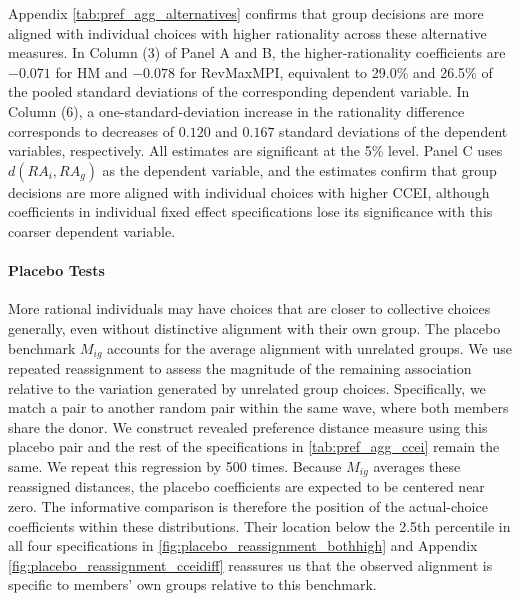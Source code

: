 \documentclass[11 pt]{article}
\begin{document}
Appendix \autoref{tab:pref_agg_alternatives} confirms that group decisions are more aligned with individual choices with higher rationality across these alternative measures. In Column (3) of Panel A and B, the higher-rationality coefficients are $-0.071$ for HM and $-0.078$ for RevMaxMPI, equivalent to 29.0\% and 26.5\% of the pooled standard deviations of the corresponding dependent variable. In Column (6), a one-standard-deviation increase in the rationality difference corresponds to decreases of $0.120$ and $0.167$ standard deviations of the dependent variables, respectively. All estimates are significant at the 5\% level. Panel C uses $d(RA_i,RA_g)$ as the dependent variable, and the estimates confirm that group decisions are more aligned with individual choices with higher CCEI, although coefficients in individual fixed effect specifications lose its significance with this coarser dependent variable.

\paragraph{Placebo Tests} More rational individuals may have choices that are closer to collective choices generally, even without distinctive alignment with their own group. The placebo benchmark $M_{ig}$ accounts for the average alignment with unrelated groups. We use repeated reassignment to assess the magnitude of the remaining association relative to the variation generated by unrelated group choices. Specifically, we match a pair to another random pair within the same wave, where both members share the donor. We construct revealed preference distance measure using this placebo pair and the rest of the specifications in \autoref{tab:pref_agg_ccei} remain the same. We repeat this regression by 500 times. Because $M_{ig}$ averages these reassigned distances, the placebo coefficients are expected to be centered near zero. The informative comparison is therefore the position of the actual-choice coefficients within these distributions. Their location below the 2.5th percentile in all four specifications in
\autoref{fig:placebo_reassignment_bothhigh} and Appendix \autoref{fig:placebo_reassignment_cceidiff} reassures us that the observed alignment is specific to members’ own groups relative to this benchmark.
\end{document}
